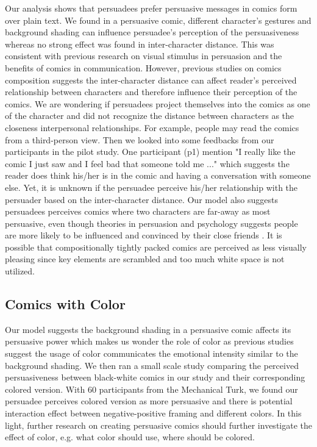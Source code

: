 Our analysis shows that persuadees prefer persuasive messages in comics form over plain text. We found in a persuasive comic, different character's gestures and background shading can influence persuadee's perception of the persuasiveness whereas no strong effect was found in inter-character distance. This was consistent with previous research on visual stimulus in persuasion and the benefits of comics in communication. However, previous studies on comics composition suggests the inter-character distance can affect reader's perceived relationship between characters and therefore influence their perception of the comics. We are wondering if persuadees project themselves into the comics as one of the character and did not recognize the distance between characters as the closeness interpersonal relationships. For example, people may read the comics from a third-person view. Then we looked into some feedbacks from our participants in the pilot study. One participant (p1) mention "I really like the comic I just saw and I feel bad that someone told me ..." which suggests the reader does think his/her is in the comic and having a conversation with someone else. Yet, it is unknown if the persuadee perceive his/her relationship with the persuader based on the inter-character distance. Our model also suggests persuadees perceives comics where two characters are far-away as most persuasive, even though theories in persuasion and psychology suggests people are more likely to be influenced and convinced by their close friends \cite{}. It is possible that compositionally tightly packed comics are perceived as less visually pleasing since key elements are scrambled and too much white space is not utilized.

\subsection{Comics with Color}
Our model suggests the background shading in a persuasive comic affects its persuasive power which makes us wonder the role of color as previous studies suggest the usage of color communicates the emotional intensity similar to the background shading. We then ran a small scale study comparing the perceived persuasiveness between black-white comics in our study and their corresponding colored version. With 60 participants from the Mechanical Turk,  we found our persuadee perceives colored version as more persuasive and there is potential interaction effect between negative-positive framing and different colors. In this light, further research on creating persuasive comics should further investigate the effect of color, e.g. what color should use, where should be colored.


